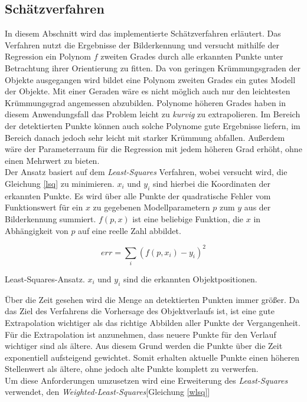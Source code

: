 \subsection{Schätzverfahren}
\label{sec_curveFit}
In diesem Abschnitt wird das implementierte Schätzverfahren erläutert. Das Verfahren nutzt die Ergebnisse der Bilderkennung und versucht mithilfe der Regression ein Polynom $f$ zweiten Grades durch alle erkannten Punkte unter Betrachtung ihrer Orientierung zu fitten. Da von geringen Krümmungsgraden der Objekte ausgegangen wird bildet eine Polynom zweiten Grades ein gutes Modell der Objekte. Mit einer Geraden wäre es nicht möglich auch nur den leichtesten Krümmungsgrad angemessen abzubilden. Polynome höheren Grades haben in diesem Anwendungsfall das Problem leicht zu \textit{kurvig} zu extrapolieren. Im Bereich der detektierten Punkte können auch solche Polynome gute Ergebnisse liefern, im Bereich danach jedoch sehr leicht mit starker Krümmung abfallen. Außerdem wäre der Parameterraum für die Regression mit jedem höheren Grad erhöht, ohne einen Mehrwert zu bieten.\\
Der Ansatz basiert auf dem \textit{Least-Squares} Verfahren\cite{simon2006optimal}, wobei versucht wird, die Gleichung \ref{lsq} zu minimieren.
$x_i$ und $y_i$ sind hierbei die Koordinaten der erkannten Punkte. Es wird über alle Punkte der quadratische Fehler vom Funktionswert für ein $x$ zu gegebenen Modellparametern $p$ zum $y$ aus der Bilderkennung summiert. $f(p,x)$ ist eine beliebige Funktion, die $x$ in Abhängigkeit von $p$ auf eine reelle Zahl abbildet.\\
\begin{ownequation}[H]
\begin{equation}
err = \sum_{i}(f(p,x_i)-y_i)^2
\end{equation}
\caption[Least-Squares-Ansatz]{Least-Squares-Ansatz. $x_i$ und $y_i$ sind die erkannten Objektpositionen.}
\label{lsq}
\end{ownequation}
Über die Zeit gesehen wird die Menge an detektierten Punkten immer größer. Da das Ziel des Verfahrens die Vorhersage des Objektverlaufs ist, ist eine gute Extrapolation wichtiger als das richtige Abbilden aller Punkte der Vergangenheit. Für die Extrapolation ist anzunehmen, dass neuere Punkte für den Verlauf wichtiger sind als ältere. Aus diesem Grund werden die Punkte über die Zeit exponentiell aufsteigend gewichtet. Somit erhalten aktuelle Punkte einen höheren Stellenwert als ältere, ohne jedoch alte Punkte komplett zu verwerfen.\\
Um diese Anforderungen umzusetzen wird eine Erweiterung des \textit{Least-Squares} verwendet, den \textit{Weighted-Least-Squares}[Gleichung \ref{wlsq}]\\

